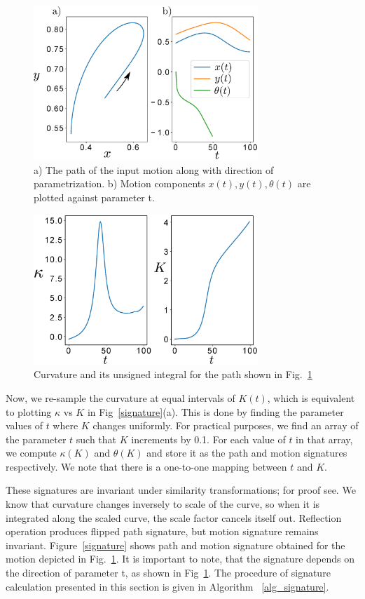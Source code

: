 \documentclass[twocolumn,10pt]{asme2e}
\begin{document}
\begin{figure}
\centering
\includegraphics[width=240pt]{figure/fig_bspline.eps}
  \caption{a) The path of the input motion along with direction of parametrization. b) Motion components $x(t), y(t), \theta(t)$ are plotted against parameter t.}
\label{bsplineFitting}
\end{figure}

\begin{figure}
\centering
\includegraphics[width=240pt]{figure/fig_curvatureK.eps}
  \caption{Curvature and its unsigned integral for the path shown in Fig.~\ref{bsplineFitting}}
\label{curvatureK}
\end{figure}

Now, we re-sample the curvature at equal intervals of $K(t)$, which is equivalent to plotting $\kappa$ vs $K$ in Fig~\ref{signature}(a).
This is done by finding the parameter values of $t$ where $K$ changes uniformly.
For practical purposes, we find an array of the parameter $t$ such that $K$ increments by 0.1.
For each value of $t$ in that array, we compute $\kappa(K)$ and $\theta(K)$ and store it as the path and motion signatures respectively.
We note that there is a one-to-one mapping between $t$ and $K$.

These signatures are invariant under similarity transformations; for proof see\cite{cui2009}.
We know that curvature changes inversely to scale of the curve, so when it is integrated along the scaled curve, the scale factor cancels itself out. Reflection operation produces flipped path signature, but motion signature remains invariant.
Figure~\ref{signature} shows path and motion signature obtained for the motion depicted in Fig.~\ref{bsplineFitting}. It is important to note, that the signature depends on the direction of parameter t, as shown in Fig~\ref{bsplineFitting}.
The procedure of signature calculation presented in this section is given in Algorithm ~\ref{alg_signature}.
\end{document}

